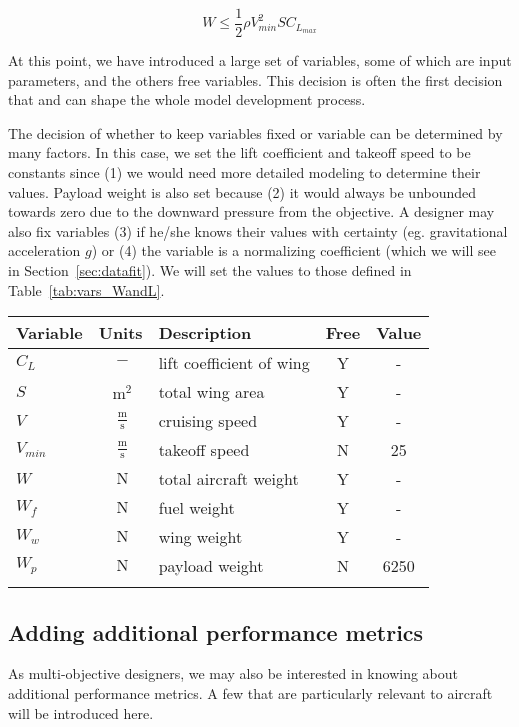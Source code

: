 \begin{equation}
    W \leq \frac{1}{2} \rho V_{min}^2 S C_{L_{max}}
\end{equation}

At this point, we have introduced a large set of variables, some of which are input
parameters, and the others free variables. This decision is often the first decision
that
and can shape the whole model development process.

The decision of whether to keep variables fixed or variable can be determined by many
factors. In this case, we set the lift coefficient and takeoff speed to be constants since
(1) we would need
more detailed modeling to determine their values. Payload weight is also set
because (2) it would always be unbounded towards zero due to the downward pressure from
the objective. A designer may also fix variables (3) if he/she knows their values with
certainty (eg. gravitational acceleration $g$) or (4) the variable is a normalizing
coefficient (which we will see in Section~\ref{sec:datafit}). We will set the values
to those defined in Table~\ref{tab:vars_WandL}.

\footnotesize
\centering
\begin{tabular}{ l c l c c}
    \toprule
	Variable & Units & Description & Free & Value \\
    \midrule
    $C_L$ & $~\mathrm{-}$ & lift coefficient of wing & Y & - \\
    $S$ & $~\mathrm{m^{2}}$ & total wing area & Y & - \\
    $V$ & $~\mathrm{\tfrac{m}{s}}$ & cruising speed & Y & - \\
    $V_{min}$ & $~\mathrm{\tfrac{m}{s}}$ & takeoff speed & N & 25 \\
    $W$ & $~\mathrm{N}$ & total aircraft weight & Y & -\\
    $W_f$ & $~\mathrm{N}$ & fuel weight & Y & -\\
    $W_w$ & $~\mathrm{N}$ & wing weight & Y & - \\
    $W_p$ & $~\mathrm{N}$ & payload weight & N & 6250\\
    \bottomrule
    \label{tab:vars_WandL}
\end{tabular}

\subsection{Adding additional performance metrics}

As multi-objective designers, we may also be interested in knowing about additional performance metrics. A
few that are particularly relevant to aircraft will be introduced here.

